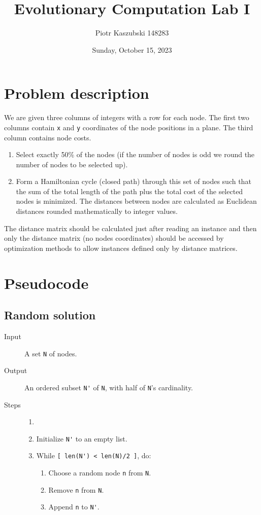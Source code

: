 \documentclass[14pt]{article}
\title{Evolutionary Computation Lab I}
\author{Piotr Kaszubski 148283}
\date{Sunday, October 15, 2023}
\begin{document}
\maketitle
\tableofcontents
\newpage

\section{Problem description}
We are given three columns of integers with a row for each node. The first two
columns contain \verb`x` and \verb`y` coordinates of the node positions in a
plane. The third column contains node costs.

\begin{enumerate}
	\item Select exactly 50\% of the nodes (if the number of nodes is odd we
		round the number of nodes to be selected up).
	\item Form a Hamiltonian cycle (closed path) through this set of nodes such
		that the sum of the total length of the path plus the total cost of the
		selected nodes is minimized. The distances between nodes are calculated
		as Euclidean distances rounded mathematically to integer values.
\end{enumerate}

The distance matrix should be calculated just after reading an instance and
then only the distance matrix (no nodes coordinates) should be accessed by
optimization methods to allow instances defined only by distance matrices.

\section{Pseudocode}
\subsection{Random solution}
\begin{description}
	\item [Input] A set \verb`N` of nodes.
	\item [Output] An ordered subset \verb`N'` of \verb`N`, with half of
		\verb`N`'s cardinality.
	\item [Steps]
		\begin{enumerate}\item []
			\item Initialize \verb`N'` to an empty list.
			\item While \verb`[ len(N') < len(N)/2 ]`, do:
				\begin{enumerate}
					\item Choose a random node \verb`n` from \verb`N`.
					\item Remove \verb`n` from \verb`N`.
					\item Append \verb`n` to \verb`N'`.
				\end{enumerate}
		\end{enumerate}
\end{description}
\end{document}

